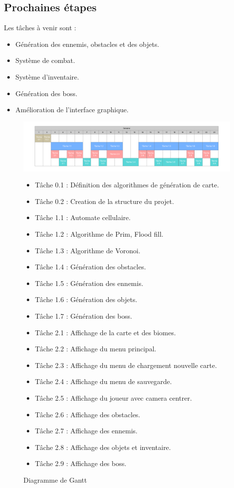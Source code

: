 \documentclass{article}
\begin{document}
\subsection{Prochaines étapes}
Les tâches à venir sont :
\begin{itemize}
    \item Génération des ennemis, obstacles et des objets.
    \item Système de combat.
    \item Système d’inventaire.
    \item Génération des boss.
    \item Amélioration de l’interface graphique.
\end{itemize}
\begin{figure}
  \centering
  \includegraphics[width=1\textwidth]{Diagramme_de_Gantt.png}
  \caption{Diagramme de Gantt}
  \vspace{1cm}
  \begin{itemize}
    
    \item Tâche 0.1 : Définition des algorithmes de génération de carte.
    \item Tâche 0.2 : Creation de la structure du projet.

    \item Tâche 1.1 : Automate cellulaire.
    \item Tâche 1.2 : Algorithme de Prim, Flood fill.
    \item Tâche 1.3 : Algorithme de Voronoi.
    \item Tâche 1.4 : Génération des obstacles.
    \item Tâche 1.5 : Génération des ennemis.
    \item Tâche 1.6 : Génération des objets.
    \item Tâche 1.7 : Génération des boss.

    \item Tâche 2.1 : Affichage de la carte et des biomes.
    \item Tâche 2.2 : Affichage du menu principal.
    \item Tâche 2.3 : Affichage du menu de chargement nouvelle carte.
    \item Tâche 2.4 : Affichage du menu de sauvegarde.
    \item Tâche 2.5 : Affichage du joueur avec camera centrer.
    \item Tâche 2.6 : Affichage des obstacles.
    \item Tâche 2.7 : Affichage des ennemis.
    \item Tâche 2.8 : Affichage des objets et inventaire.
    \item Tâche 2.9 : Affichage des boss.


\end{itemize}
\end{figure}
\end{document}
